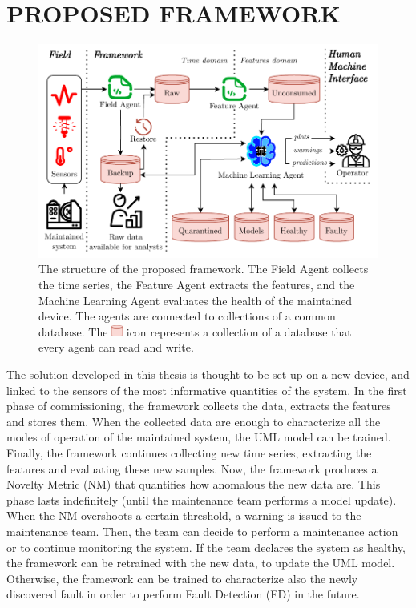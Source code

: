 \section{PROPOSED FRAMEWORK}
\label{sec:framework}
\begin{figure}
    \includegraphics[width=\linewidth]{images/Framework_structure.pdf}
    \caption{The structure of the proposed framework. The Field Agent collects the time series, the Feature Agent extracts the features, and the Machine Learning Agent evaluates the health of the maintained device. The agents are connected to collections of a common database. The \includegraphics[height = 1em]{images/DB_icon-cropped.pdf} icon represents a collection of a database that every agent can read and write.}
    \label{fig:framework_structure}
\end{figure}

The solution developed in this thesis is thought to be set up on a new device, and linked to the sensors of the most informative quantities of the system.
In the first phase of commissioning, the framework collects the data, extracts the features and stores them. When the collected data are enough to characterize all the modes of operation of the maintained system, the UML model can be trained. Finally, the framework continues collecting new time series, extracting the features and evaluating these new samples. Now, the framework produces a Novelty Metric (NM) that quantifies how anomalous the new data are. 
This phase lasts indefinitely (until the maintenance team performs a model update). When the NM overshoots a certain threshold, a warning is issued to the maintenance team. 
Then, the team can decide to perform a maintenance action or to continue monitoring the system. If the team declares the system as healthy, the framework can be retrained with the new data, to update the UML model. Otherwise, the framework can be trained to characterize also the newly discovered fault in order to perform Fault Detection (FD) in the future.

